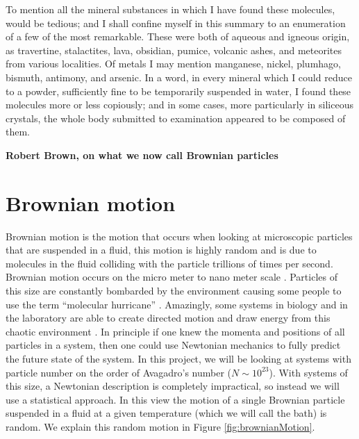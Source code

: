 \epigraph{
To mention all the mineral substances in which I have found these molecules, would be tedious; and I shall confine myself in this summary to an enumeration of a few of the most remarkable. These were both of aqueous and igneous origin, as travertine, stalactites, lava, obsidian, pumice, volcanic ashes, and meteorites from various localities. Of metals I may mention manganese, nickel, plumhago, bismuth, antimony, and arsenic. In a word, in every mineral which I could reduce to a powder, sufficiently fine to be temporarily suspended in water, I found these molecules more or less copiously; and in some cases, more particularly in siliceous crystals, the whole body submitted to examination appeared to be composed of them.}{\textbf{Robert Brown, on what we now call Brownian particles}}

\section{Brownian motion}
Brownian motion is the motion that occurs when looking at microscopic particles that are suspended in a fluid, this motion is highly random and is due to molecules in the fluid colliding with the particle trillions of times per second. Brownian motion occurs on the micro meter to nano meter scale \cite{KellerBustamante2000,Reimann2001}. Particles of this size are constantly bombarded by the environment causing some people to use the term ``molecular hurricane'' \cite{Astumian2007}. Amazingly, some systems in biology and in the laboratory are able to create directed motion and draw energy from this chaotic environment \cite{Reimann2001}. In principle if one knew the momenta and positions of all particles in a system, then one could use Newtonian mechanics to fully predict the future state of the system. In this project, we will be looking at systems with particle number on the order of Avagadro's number ($N \sim 10^{23}$). With systems of this size, a Newtonian description is completely impractical, so instead we will use a statistical approach. In this view the motion of a single Brownian particle suspended in a fluid at a given temperature (which we will call the bath) is random. We explain this random motion in Figure \ref{fig:brownianMotion}.

